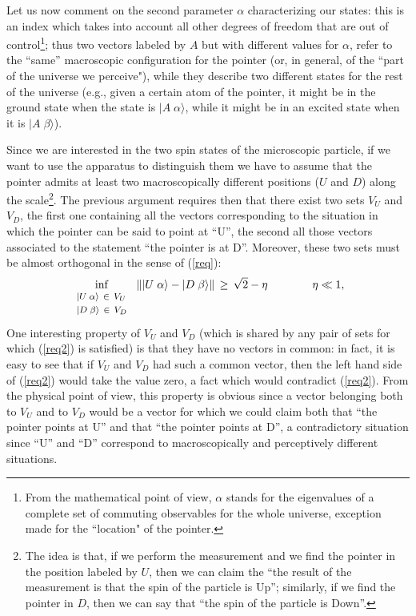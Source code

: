 \documentclass[10pt,a4paper]{article}
\begin{document}
Let us now comment on the second parameter $\alpha$ characterizing
our states: this is an index which takes into account all other
degrees of freedom that are out of control\footnote{From the
mathematical point of view, $\alpha$ stands for the eigenvalues of
a  complete set of commuting observables for the whole universe,
exception made for the ``location" of the pointer.}; thus two vectors
labeled by $A$ but with different values for $\alpha$, refer to
the ``same'' macroscopic configuration for the pointer (or, in
general, of the ``part of the universe we perceive"), while they
describe two different states for the rest of the universe (e.g.,
given a certain atom of the pointer, it might be in the ground
state when the state is $|A\; \alpha\rangle$, while it might be in
an excited state when it is $|A\;\beta\rangle$).

Since we are interested in the two spin states of the microscopic
particle, if we want to use the apparatus to distinguish them we
have to assume that the pointer admits at least two
macroscopically different positions ($U$ and $D$) along the
scale\footnote{The idea is that, if we perform the measurement and
we find the pointer in the position labeled by $U$, then we can
claim the ``the result of the measurement is that the spin of the
particle is Up''; similarly, if we find the pointer in $D$, then
we can say that ``the spin of the particle is Down''.}. The
previous argument requires then that there exist two sets $V_{U}$
and $V_{D}$, the first one containing all the vectors
corresponding to the situation in which the pointer can be said to
point at ``U'', the second all those vectors associated to the
statement ``the pointer is at D''. Moreover, these two sets must
be almost orthogonal in the sense of (\ref{req}):
\begin{equation} \label{req2}
\inf_{\begin{array}{l}
\makebox{\footnotesize $|U\;\alpha\rangle \,\in\, V_{U}$} \\
\makebox{\footnotesize $|D\;\beta\rangle \,\in\, V_{D}$}
\end{array}}\, \| |U\;\alpha\rangle -
|D\;\beta\rangle \|\, \geq\, \sqrt{2} - \eta \qquad\qquad \eta \ll
1,
\end{equation}
One interesting property of $V_{U}$ and $V_{D}$ (which is shared
by any pair  of sets for which (\ref{req2}) is satisfied) is that
they have no vectors in common: in fact, it is easy to see that if
$V_{U}$ and $V_{D}$ had such a common vector, then the left hand
side of (\ref{req2}) would take the value zero, a fact which would
contradict (\ref{req2}). From the physical point of view, this
property is obvious since a vector belonging both to $V_{U}$ and
to $V_{D}$ would be a vector for which we could claim both that
``the pointer points at U'' and that ``the pointer points at D'',
a contradictory situation since ``U'' and ``D'' correspond to
macroscopically and perceptively different situations.
\end{document}
